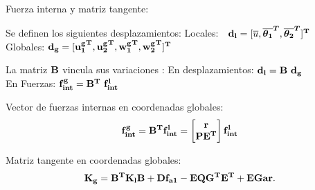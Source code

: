 \documentclass[
  aspectratio=169,
]{beamer}
\begin{document}
\begin{small}
\begin{frame}{Fuerza interna y matriz tangente:}
	\begin{minipage}[t]{0.46\linewidth}
		\begin{block}{Se definen los siguientes desplazamientos:}
			Locales: $~~\bf{d_l} = [\text{$\overline{u}$}, \boldsymbol{\overline{ \theta _1}^T},	\boldsymbol{ \overline{ \theta _2}^T}]^T$\\
			Globales: $\bf{ d_g} = [\bf{ u_1^g}^T, \bf{ u_2^g}^T, \bf{{w_1^g}^T}, \bf{{w_2^g}^T}]^T$
		\end{block}
		\begin{block}{La matriz $\bf{B}$ vincula sus variaciones :}
			En desplazamientos: $\bf{ d_l}=\bf{B}~\bf{ d_g}$ \\
			En Fuerzas: $\bf{f_{int}^g}=\bf{B}^T~\bf{ f_{int}^l}$
		\end{block}
	\end{minipage}\hfill
	\begin{minipage}[t]{0.49\linewidth}
	\begin{block}{Vector de fuerzas internas en coordenadas globales:}
		\begin{equation}
			\bf{f_{int}^g}=\bf{B}^T\bf{f_{int}^l}= \begin{bmatrix}
			\bf{r}\\
			\bf{PE^T}
			\end{bmatrix}\bf{f_{int}^l}
		\end{equation}
	\end{block}
	\begin{block}{Matriz tangente en coordenadas globales:}
		\begin{equation}
			\bf{K_g}=\bf{B}^T\bf{K_l}\bf{B}+\bf{D} f_{a1}-\bf{E}\bf{Q}\bf{G^T}\bf{E^T} +\bf{EGar}.
		\end{equation}
	\end{block}
	\end{minipage}
\end{frame}




\end{small}
\end{document}
